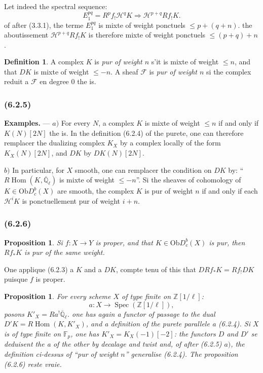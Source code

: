 \documentclass[12pt,a4paper]{article}
\theoremstyle{plain}
\newtheorem{proposition}[theorem]{Proposition}
\theoremstyle{definition}
\newtheorem{definition}[theorem]{Definition}
\theoremstyle{remark}
\newcommand{\Ob}{\mathrm{Ob}}
\DeclareMathOperator{\Hom}{Hom}
\DeclareMathOperator{\Spec}{Spec}
\newcommand{\bbZ}{\mathbb{Z}}
\newcommand{\scrF}{\mathscr{F}}
\newcommand{\scrH}{\mathscr{H}}
\newcommand{\Qlb}{\overline{\mathbb{Q}}_\ell}
\newcommand{\Fp}{\mathbb{F}_p}
\begin{document}
Let indeed the spectral sequence:
\[
E_1^{pq} = R^p f_! \scrH^q K \Rightarrow \scrH^{p+q} Rf_! K.
\]
of after (3.3.1), the terme $E_1^{pq}$ is mixte of weight ponctuels $\leq p + (q + n)$. the aboutissement $\scrH^{p+q} Rf_! K$ is therefore mixte of weight ponctuels $\leq (p+q) + n$.

\begin{definition}
A complex $K$ is \emph{pur of weight $n$} s'it is mixte of weight $\leq n$, and that $DK$ is mixte of weight $\leq -n$. A sheaf $\scrF$ is \emph{pur of weight $n$} si the complex reduit a $\scrF$ en degree $0$ the is.
\end{definition}

\subsubsection*{\textup{(6.2.5)}}

\textbf{Examples.} --- $a)$ For every $N$, a complex $K$ is mixte of weight $\leq n$ if and only if $K(N)[2N]$ the is. In the definition (6.2.4) of the purete, one can therefore remplacer the dualizing complex $K_X$ by a complex locally of the form $K_X(N)[2N]$, and $DK$ by $DK(N)[2N]$.

$b)$ In particular, for $X$ smooth, one can remplacer the condition on $DK$ by: ``$R\Hom(K, \Qlb)$ is mixte of weight $\leq -n$''. Si the sheaves of cohomology of $K \in \Ob D_c^b(X)$ are smooth, the complex $K$ is pur of weight $n$ if and only if each $\scrH^i K$ is ponctuellement pur of weight $i + n$.

\subsubsection*{\textup{(6.2.6)}}

\begin{proposition}
Si $f : X \to Y$ is proper, and that $K \in \Ob D_c^b(X)$ is pur, then $Rf_* K$ is pur of the same weight.
\end{proposition}

One applique (6.2.3) a $K$ and a $DK$, compte tenu of this that $DRf_* K = Rf_! DK$ puisque $f$ is proper.

\begin{proposition}
For every scheme $X$ of type finite on $\bbZ[1/\ell]$:
\[
a : X \to \Spec(\bbZ[1/\ell]),
\]
posons $K'_X = Ra^! \Qlb$. one has again a functor of passage to the dual $D' K = R\Hom(K, K'_X)$, and a definition of the purete parallele a (6.2.4). Si $X$ is of type finite on $\Fp$, one has $K'_X = K_X(-1)[-2]$: the functors $D$ and $D'$ se deduisent the a of the other by decalage and twist and, of after (6.2.5) $a)$, the definition ci-dessus of ``pur of weight $n$'' generalise (6.2.4). The proposition (6.2.6) reste vraie.
\end{proposition}
\end{document}
